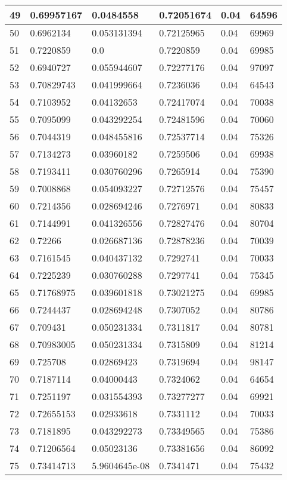\begin{longtable}{|l|l|l|l|l|l|}
49 & 0.69957167 & 0.0484558 & 0.72051674 & 0.04 & 64596 \\ \hline 
50 & 0.6962134 & 0.053131394 & 0.72125965 & 0.04 & 69969 \\ \hline 
51 & 0.7220859 & 0.0 & 0.7220859 & 0.04 & 69985 \\ \hline 
52 & 0.6940727 & 0.055944607 & 0.72277176 & 0.04 & 97097 \\ \hline 
53 & 0.70829743 & 0.041999664 & 0.7236036 & 0.04 & 64543 \\ \hline 
54 & 0.7103952 & 0.04132653 & 0.72417074 & 0.04 & 70038 \\ \hline 
55 & 0.7095099 & 0.043292254 & 0.72481596 & 0.04 & 70060 \\ \hline 
56 & 0.7044319 & 0.048455816 & 0.72537714 & 0.04 & 75326 \\ \hline 
57 & 0.7134273 & 0.03960182 & 0.7259506 & 0.04 & 69938 \\ \hline 
58 & 0.7193411 & 0.030760296 & 0.7265914 & 0.04 & 75390 \\ \hline 
59 & 0.7008868 & 0.054093227 & 0.72712576 & 0.04 & 75457 \\ \hline 
60 & 0.7214356 & 0.028694246 & 0.7276971 & 0.04 & 80833 \\ \hline 
61 & 0.7144991 & 0.041326556 & 0.72827476 & 0.04 & 80704 \\ \hline 
62 & 0.72266 & 0.026687136 & 0.72878236 & 0.04 & 70039 \\ \hline 
63 & 0.7161545 & 0.040437132 & 0.7292741 & 0.04 & 70033 \\ \hline 
64 & 0.7225239 & 0.030760288 & 0.7297741 & 0.04 & 75345 \\ \hline 
65 & 0.71768975 & 0.039601818 & 0.73021275 & 0.04 & 69985 \\ \hline 
66 & 0.7244437 & 0.028694248 & 0.7307052 & 0.04 & 80786 \\ \hline 
67 & 0.709431 & 0.050231334 & 0.7311817 & 0.04 & 80781 \\ \hline 
68 & 0.70983005 & 0.050231334 & 0.7315809 & 0.04 & 81214 \\ \hline 
69 & 0.725708 & 0.02869423 & 0.7319694 & 0.04 & 98147 \\ \hline 
70 & 0.7187114 & 0.04000443 & 0.7324062 & 0.04 & 64654 \\ \hline 
71 & 0.7251197 & 0.031554393 & 0.73277277 & 0.04 & 69921 \\ \hline 
72 & 0.72655153 & 0.02933618 & 0.7331112 & 0.04 & 70033 \\ \hline 
73 & 0.7181895 & 0.043292273 & 0.73349565 & 0.04 & 75386 \\ \hline 
74 & 0.71206564 & 0.05023136 & 0.73381656 & 0.04 & 86092 \\ \hline 
75 & 0.73414713 & 5.9604645e-08 & 0.7341471 & 0.04 & 75432 \\ \hline 
\end{longtable}